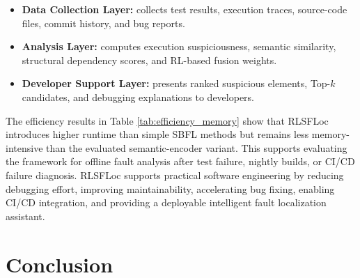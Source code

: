 \documentclass[article,article,submit,pdftex,moreauthors]{Definitions/mdpi}
\begin{document}
\begin{itemize}
    \item \textbf{Data Collection Layer:} collects test results, execution traces, source-code files, commit history, and bug reports.
    \item \textbf{Analysis Layer:} computes execution suspiciousness, semantic similarity, structural dependency scores, and RL-based fusion weights.
    \item \textbf{Developer Support Layer:} presents ranked suspicious elements, Top-$k$ candidates, and debugging explanations to developers.
\end{itemize}

The efficiency results in Table \ref{tab:efficiency_memory} show that RLSFLoc introduces higher runtime than simple SBFL methods but remains less memory-intensive than the evaluated semantic-encoder variant. This supports evaluating the framework for offline fault analysis after test failure, nightly builds, or CI/CD failure diagnosis. RLSFLoc supports practical software engineering by reducing debugging effort, improving maintainability, accelerating bug fixing, enabling CI/CD integration, and providing a deployable intelligent fault localization assistant.

\section{Conclusion}
\label{sec:conclusion}
\end{document}
